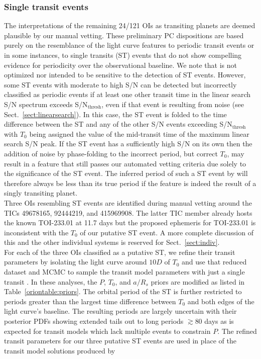 \subsubsection{Single transit events} \label{sect:ste}
The interpretations of the remaining 24/121 OIs as transiting planets
are deemed plausible by our manual vetting. These preliminary PC dispositions are based purely on the
resemblance of the light curve features to periodic transit events or in some instances, to single
transits (ST) events that do not show compelling evidence for periodicity over the observational baseline.
We note that \pipeline{} is not optimized nor intended to be sensitive to the detection of ST
events. However, some ST events with moderate to high S/N can be detected but incorrectly classified as
periodic events if at least one other transit time in the linear search S/N spectrum exceeds
S/N$_{\text{thresh}}$, even if that event is resulting from noise (see Sect.~\ref{sect:linearsearch}).
In this case, the ST event is folded to the time difference between the ST and any of the other S/N
events exceeding S/N$_{\text{thresh}}$ with $T_0$ being assigned the value of the mid-transit time
of the maximum linear search S/N peak. If the ST event has a sufficiently high S/N on its own
then the addition of noise by phase-folding to the incorrect
period, but correct $T_0$, may result in a feature that still passes our automated vetting criteria due solely
to the significance of the ST event. The inferred period of such a ST event by \pipeline{} will therefore
always be less than its true period if the feature is indeed the result of a singly transiting planet. \\

Three OIs resembling ST events are identified during manual vetting around the TICs 49678165, 92444219,
and 415969908. The latter TIC member already hosts the known TOI-233.01 at 11.7 days but the proposed ephemeris for
TOI-233.01 is inconsistent with the $T_0$ of our putative ST event. A more complete discussion of
this and the other individual systems is reserved for Sect.~\ref{sect:indiv}. \\

For each of the three OIs classified as a putative ST, we refine
their transit parameters by isolating the light curve around $10D$ of $T_0$ and 
use that reduced dataset and
MCMC to sample the transit model parameters with just a single transit \citep{seager03}. In these
analyses, the $P$, $T_0$, and $a/R_s$ priors are modified as listed in Table~\ref{oriontable:priors}.
The orbital period of the ST is further restricted to periods greater than the largest time difference
between $T_0$ and both edges of the light curve's baseline. 
The resulting periods are largely uncertain with their posterior PDFs showing extended tails out to long
periods $\gtrsim 80$ days as is expected for transit models which lack multiple events to constrain $P$.
The refined transit parameters for our three putative ST events
are used in place of the transit model solutions produced by 


